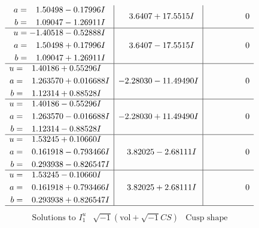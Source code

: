 \documentclass[1p]{elsarticle_modified}
\theoremstyle{definition}
\newcommand{\I}{\sqrt{-1}}
\begin{document}
$$\begin{array}{c|c|c}
\begin{aligned}
a &= \phantom{-}1.50498 - 0.17996 I \\
b &= \phantom{-}1.09047 - 1.26911 I\end{aligned}
 & \phantom{-}3.6407 + 17.5515 I & \phantom{-0.000000 } 0 \\ \hline\begin{aligned}
u &= -1.40518 - 0.52888 I \\
a &= \phantom{-}1.50498 + 0.17996 I \\
b &= \phantom{-}1.09047 + 1.26911 I\end{aligned}
 & \phantom{-}3.6407 - 17.5515 I & \phantom{-0.000000 } 0 \\ \hline\begin{aligned}
u &= \phantom{-}1.40186 + 0.55296 I \\
a &= \phantom{-}1.263570 + 0.016688 I \\
b &= \phantom{-}1.12314 + 0.88528 I\end{aligned}
 & -2.28030 - 11.49490 I & \phantom{-0.000000 } 0 \\ \hline\begin{aligned}
u &= \phantom{-}1.40186 - 0.55296 I \\
a &= \phantom{-}1.263570 - 0.016688 I \\
b &= \phantom{-}1.12314 - 0.88528 I\end{aligned}
 & -2.28030 + 11.49490 I & \phantom{-0.000000 } 0 \\ \hline\begin{aligned}
u &= \phantom{-}1.53245 + 0.10660 I \\
a &= \phantom{-}0.161918 - 0.793466 I \\
b &= \phantom{-}0.293938 - 0.826547 I\end{aligned}
 & \phantom{-}3.82025 - 2.68111 I & \phantom{-0.000000 } 0 \\ \hline\begin{aligned}
u &= \phantom{-}1.53245 - 0.10660 I \\
a &= \phantom{-}0.161918 + 0.793466 I \\
b &= \phantom{-}0.293938 + 0.826547 I\end{aligned}
 & \phantom{-}3.82025 + 2.68111 I & \phantom{-0.000000 } 0\\
 \hline 
 \end{array}$$\newpage$$\begin{array}{c|c|c}  
\text{Solutions to }I^u_{1}& \I (\text{vol} + \sqrt{-1}CS) & \text{Cusp shape}\\
 \hline 
\begin{aligned}

\end{aligned}
\end{array}$$
\end{document}
